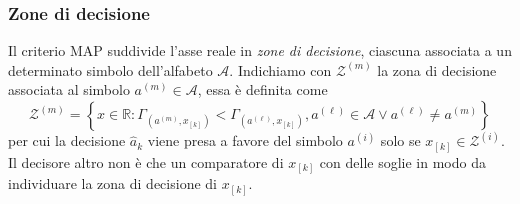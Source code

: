         \subsubsection{Zone di decisione}
            Il criterio MAP suddivide l'asse reale in \emph{zone di decisione}, ciascuna associata a un determinato simbolo dell'alfabeto $\mathcal{A}$.
            Indichiamo con $\mathcal{Z}^{(m)}$ la zona di decisione associata al simbolo $a^{(m)}\in\mathcal{A}$, essa è definita come
            \[
                \mathcal{Z}^{(m)} = \left\{ x\in\mathbb{R}: \Gamma_{(a^{(m)},x_{[k]})}<\Gamma_{(a^{(\ell)},x_{[k]})}, a^{(\ell)}\in\mathcal{A} \vee a^{(\ell)}\neq a^{(m)} \right\}
            \]   
            per cui la decisione $\hat{a}_{k}$ viene presa a favore del simbolo $a^{(i)}$ solo se $x_{[k]}\in \mathcal{Z}^{(i)}$. Il decisore altro non è 
            che un comparatore di $x_{[k]}$ con delle soglie in modo da individuare la zona di decisione di $x_{[k]}$. 
